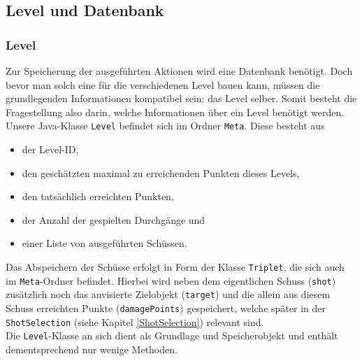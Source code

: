 \subsection{Level und Datenbank}

\subsubsection{Level} \label{Level}
Zur Speicherung der ausgeführten Aktionen wird eine Datenbank benötigt. Doch bevor man solch eine für die verschiedenen Level bauen kann, müssen die grundlegenden Informationen kompatibel sein: das Level selber. Somit besteht die Fragestellung also darin, welche Informationen über ein Level benötigt werden. \\ Unsere Java-Klasse \texttt{Level} befindet sich im Ordner \texttt{Meta}. Diese besteht aus
\begin{itemize}
\item der Level-ID, 
\item den geschätzten maximal zu erreichenden Punkten dieses Levels, 
\item den tatsächlich erreichten Punkten, 
\item der Anzahl der gespielten Durchgänge und 
\item einer Liste von ausgeführten Schüssen.
\end{itemize} 
Das Abspeichern der Schüsse erfolgt in Form der Klasse \texttt{Triplet}, die sich auch im \texttt{Meta}-Ordner befindet. Hierbei wird neben dem eigentlichen Schuss (\texttt{shot}) zusätzlich noch das anvisierte Zielobjekt (\texttt{target}) und die allein aus diesem Schuss erreichten Punkte (\texttt{damagePoints}) gespeichert, welche später in der \texttt{ShotSelection} (siehe Kapitel \ref{ShotSelection}) relevant sind. \\
Die \texttt{Level}-Klasse an sich dient als Grundlage und Speicherobjekt und enthält dementsprechend nur wenige Methoden. 

